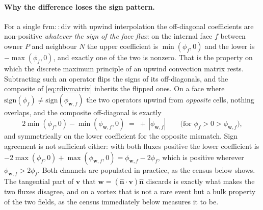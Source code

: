 \documentclass[preprint,3p,11pt]{elsarticle}
\newcommand{\nhat}{\hat{\mathbf{n}}}
\begin{document}
\paragraph{Why the difference loses the sign pattern.} For a single
$\mathrm{fvm::div}$ with upwind interpolation the off-diagonal coefficients are
non-positive \emph{whatever the sign of the face flux}: on the internal face $f$
between owner $P$ and neighbour $N$ the upper coefficient is $\min(\phi_f,0)$ and
the lower is $-\max(\phi_f,0)$, and exactly one of the two is nonzero. That is the
property on which the discrete maximum principle of an upwind convection matrix
rests. Subtracting such an operator flips the signs of its off-diagonals, and the
composite of \eqref{eq:rdivmatrix} inherits the flipped ones. On a face where
$\mathrm{sign}(\phi_f) \neq \mathrm{sign}(\phi_{\mathbf{w},f})$ the two operators
upwind from \emph{opposite} cells, nothing overlaps, and the composite
off-diagonal is exactly
\begin{equation}
  2\min(\phi_f,0) - \min(\phi_{\mathbf{w},f},0) \;=\; +\,|\phi_{\mathbf{w},f}|
  \qquad\text{(for } \phi_f > 0 > \phi_{\mathbf{w},f}\text{)},
  \label{eq:posoffdiag}
\end{equation}
and symmetrically on the lower coefficient for the opposite mismatch. Sign
agreement is not sufficient either: with both fluxes positive the lower
coefficient is $-2\max(\phi_f,0) + \max(\phi_{\mathbf{w},f},0) = \phi_{\mathbf{w},f}
- 2\phi_f$, which is positive wherever
$\phi_{\mathbf{w},f} > 2\phi_f$. Both channels are populated in practice, as the
census below shows. The tangential part of $\mathbf{v}$ that
$\mathbf{w} = (\nhat\cdot\mathbf{v})\nhat$ discards is exactly what makes the two
fluxes disagree, and on a vortex that is not a rare event but a bulk property of
the two fields, as the census immediately below measures it to be.
\end{document}
